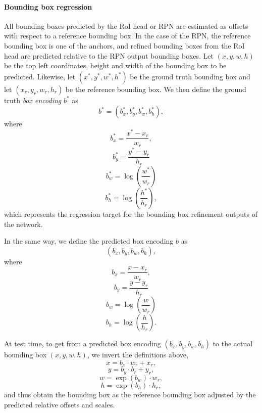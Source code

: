 \paragraph{Bounding box regression}
All bounding boxes predicted by the RoI head or RPN are estimated as offsets
with respect to a reference bounding box. In the case of the RPN,
the reference bounding box is one of the anchors, and refined bounding boxes from the RoI head are
predicted relative to the RPN output bounding boxes.
Let $(x, y, w, h)$ be the top left coordinates, height and width of the bounding box
to be predicted. Likewise, let $(x^*, y^*, w^*, h^*)$ be the ground truth bounding
box and let $(x_r, y_r, w_r, h_r)$ be the reference bounding box.
We then define the ground truth \emph{box encoding} $b^*$ as
\begin{equation*}
b^* = (b_x^*, b_y^*, b_w^*, b_h^*),
\end{equation*}
where
\begin{equation*}
b_x^* = \frac{x^* - x_r}{w_r},
\end{equation*}
\begin{equation*}
b_y^* = \frac{y^* - y_r}{h_r}
\end{equation*}
\begin{equation*}
b_w^* = \log \left( \frac{w^*}{w_r} \right)
\end{equation*}
\begin{equation*}
b_h^* = \log \left( \frac{h^*}{h_r} \right),
\end{equation*}
which represents the regression target for the bounding box refinement
outputs of the network.

In the same way, we define the predicted box encoding $b$ as
\begin{equation*}
(b_x, b_y, b_w, b_h),
\end{equation*}
where
\begin{equation*}
b_x = \frac{x - x_r}{w_r},
\end{equation*}
\begin{equation*}
b_y = \frac{y - y_r}{h_r}
\end{equation*}
\begin{equation*}
b_w = \log \left( \frac{w}{w_r} \right)
\end{equation*}
\begin{equation*}
b_h = \log \left( \frac{h}{h_r} \right).
\end{equation*}

At test time, to get from a predicted box encoding $(b_x, b_y, b_w, b_h)$ to the actual bounding box $(x, y, w, h)$,
we invert the definitions above,
\begin{equation*}
x = b_x \cdot w_r + x_r,
\end{equation*}
\begin{equation*}
y = b_y \cdot b_r + y_r,
\end{equation*}
\begin{equation*}
w = \exp(b_w) \cdot w_r,
\end{equation*}
\begin{equation*}
h = \exp(b_h) \cdot h_r,
\end{equation*}
and thus obtain the bounding box as the reference bounding box adjusted by
the predicted relative offsets and scales.



